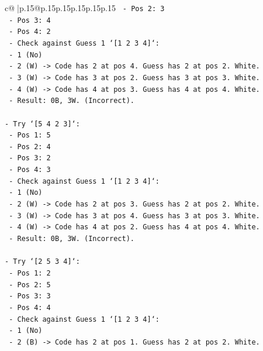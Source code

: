 \documentclass{article}
\begin{document}
{\begin{supertabular}{c@{$\;$}|p{.15\linewidth}@{}p{.15\linewidth}p{.15\linewidth}p{.15\linewidth}p{.15\linewidth}p{.15\linewidth}}
{{{\texttt{    {-}   Pos 2: 3} \\
\texttt{    {-}   Pos 3: 4} \\
\texttt{    {-}   Pos 4: 2} \\
\texttt{    {-}   Check against Guess 1 `{[}1 2 3 4{]}`:} \\
\texttt{        {-}   1 (No)} \\
\texttt{        {-}   2 (W) {-}> Code has 2 at pos 4. Guess has 2 at pos 2. White.} \\
\texttt{        {-}   3 (W) {-}> Code has 3 at pos 2. Guess has 3 at pos 3. White.} \\
\texttt{        {-}   4 (W) {-}> Code has 4 at pos 3. Guess has 4 at pos 4. White.} \\
\texttt{        {-}   Result: 0B, 3W. (Incorrect).} \\
\\ 
\texttt{{-}   Try `{[}5 4 2 3{]}`:} \\
\texttt{    {-}   Pos 1: 5} \\
\texttt{    {-}   Pos 2: 4} \\
\texttt{    {-}   Pos 3: 2} \\
\texttt{    {-}   Pos 4: 3} \\
\texttt{    {-}   Check against Guess 1 `{[}1 2 3 4{]}`:} \\
\texttt{        {-}   1 (No)} \\
\texttt{        {-}   2 (W) {-}> Code has 2 at pos 3. Guess has 2 at pos 2. White.} \\
\texttt{        {-}   3 (W) {-}> Code has 3 at pos 4. Guess has 3 at pos 3. White.} \\
\texttt{        {-}   4 (W) {-}> Code has 4 at pos 2. Guess has 4 at pos 4. White.} \\
\texttt{        {-}   Result: 0B, 3W. (Incorrect).} \\
\\ 
\texttt{{-}   Try `{[}2 5 3 4{]}`:} \\
\texttt{    {-}   Pos 1: 2} \\
\texttt{    {-}   Pos 2: 5} \\
\texttt{    {-}   Pos 3: 3} \\
\texttt{    {-}   Pos 4: 4} \\
\texttt{    {-}   Check against Guess 1 `{[}1 2 3 4{]}`:} \\
\texttt{        {-}   1 (No)} \\
\texttt{        {-}   2 (B) {-}> Code has 2 at pos 1. Guess has 2 at pos 2. White.} \\
}}}
\end{supertabular}}
\end{document}
